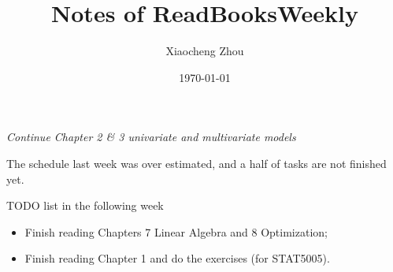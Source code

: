 \documentclass[working]{article}
\title{Notes of ReadBooksWeekly}
\author{Xiaocheng Zhou}
\date{\today}
\begin{document}
\maketitle



% 

\setcounter{section}{2}
\setcounter{subsection}{2}
\begin{center}
\textit{Continue Chapter 2 \& 3 univariate and multivariate models}
\end{center}


\begin{framed}{\large
The schedule last week was over estimated, 
and a half of tasks are not finished yet.

TODO list in the following week
\begin{itemize}
    \item Finish reading Chapters 7 Linear Algebra and 8 Optimization;
    \item Finish reading \citep{shao2003mathematical} Chapter 1 and 
    do the exercises (for STAT5005).
\end{itemize}
}
\end{framed}

% 



\listnotes

\end{document}
